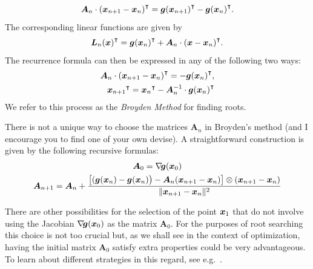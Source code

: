\begin{equation}\label{equation:SecantProperty}
\boldsymbol{A}_n \cdot {(\boldsymbol{x}_{n+1} - \boldsymbol{x}_n)}^\intercal = {\boldsymbol{g}(\boldsymbol{x}_{n+1})}^\intercal - {\boldsymbol{g}(\boldsymbol{x}_n)}^\intercal.
\end{equation}
The corresponding linear functions are given by 
\begin{equation*}
{\boldsymbol{L}_n (\boldsymbol{x})}^\intercal = {\boldsymbol{g}(\boldsymbol{x}_n)}^\intercal + \boldsymbol{A}_n \cdot {(\boldsymbol{x}- \boldsymbol{x}_n)}^\intercal.
\end{equation*}
The recurrence formula can then be expressed in any of the following two ways:
\begin{equation}
\begin{split}
\boldsymbol{A}_n \cdot {(\boldsymbol{x}_{n+1} - \boldsymbol{x}_n )}^\intercal = -{\boldsymbol{g}(\boldsymbol{x}_n)}^\intercal, \\
{\boldsymbol{x}_{n+1}}^\intercal = {\boldsymbol{x}_n}^\intercal - \boldsymbol{A}_n^{-1} \cdot {\boldsymbol{g}(\boldsymbol{x}_n)}^\intercal
\end{split}
\end{equation}
We refer to this process as the \emph{Broyden Method} for finding roots.

\begin{remark}
There is not a unique way to choose the matrices $\boldsymbol{A}_n$ in Broyden's method (and I encourage you to find one of your own devise).  A straightforward construction is given by the following recursive formulas:
\begin{gather}\index{Broyden Method!recursive formula}\index{Broyden Method!iteration}
\boldsymbol{A}_0 = \gradient{\boldsymbol{g}}(\x_0) \nonumber \\
\boldsymbol{A}_{n+1} = \boldsymbol{A}_n + \frac{\big[ (\boldsymbol{g}(\x_n)-\boldsymbol{g}(\x_n)\big) - \boldsymbol{A}_n (\x_{n+1}-\x_n) \big] \otimes (\x_{n+1} -\x_n)}{\norm{\x_{n+1}-\x_n}^2} \label{equation:Broyden}
\end{gather}
\end{remark}

\begin{remark}
There are other possibilities for the selection of the point $\boldsymbol{x}_1$ that do not involve using the Jacobian $\mathop{\nabla\! {\boldsymbol{g}}}(\boldsymbol{x}_0)$ as the matrix $\boldsymbol{A}_0$.  For the purposes of root searching this choice is not too crucial but, as we shall see in the context of optimization, having the initial matrix $\boldsymbol{A}_0$ satisfy extra properties could be very advantageous.  To learn about different strategies in this regard, see e.g.~\cite[chapter 8]{dennis1996numerical}.
\end{remark}


